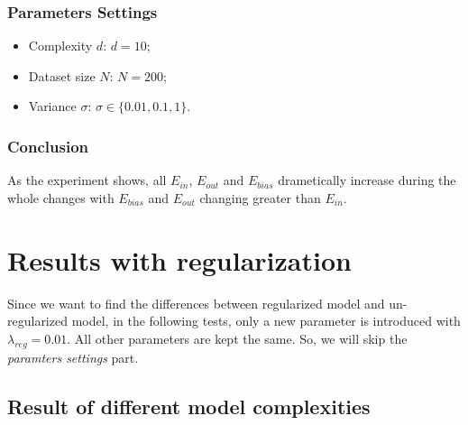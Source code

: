 \documentclass{article}
\begin{document}
\subsubsection{Parameters Settings}
\begin{itemize}
    \item Complexity $d$: $d = 10$;
    \item Dataset size $N$: $N = 200$;
    \item Variance $\sigma$: $\sigma \in \{ 0.01, 0.1, 1 \}$.
\end{itemize}

\subsubsection{Conclusion}

As the experiment shows, all $E_{in}$, $E_{out}$ and $E_{bias}$ drametically increase during the whole changes with $E_{bias}$ and $E_{out}$ changing greater than $E_{in}$.

\section{Results with regularization}

Since we want to find the differences between regularized model and un-regularized model, in the following tests, only a new parameter is introduced with $\lambda_{reg} = 0.01$. All other parameters are kept the same. So, we will skip the \emph{paramters settings} part.

\subsection{Result of different model complexities}
\end{document}
